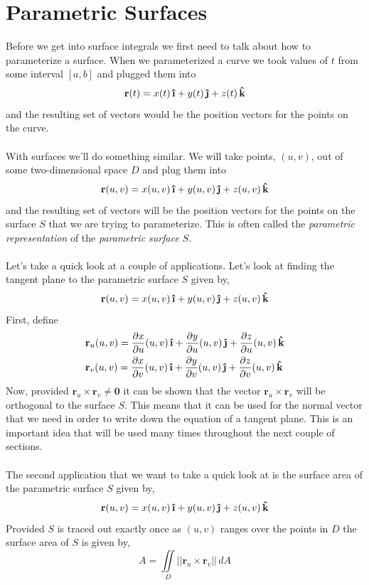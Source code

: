 \documentclass[10pt,reqno]{book}
\theoremstyle{definition}
\renewcommand{\vec}[1]{\mathbf{#1}}
\newcommand{\uvec}[1]{\boldsymbol{\hat{\textbf{#1}}}}
\begin{document}
	\section{Parametric Surfaces}
	
	Before we get into surface integrals we first need to talk about how to parameterize a surface. When we parameterized a curve we took values of $ t $ from some interval $ [a,b] $ and plugged them into
	\[ \vec{r}(t) = x(t)\,\uvec{\i} + y(t)\,\uvec{\j} + z(t)\,\uvec{k} \]
	and the resulting set of vectors would be the position vectors for the points on the curve. \\ \\
	With surfaces we'll do something similar. We will take points, $ (u,v) $, out of some two-dimensional space $ D $ and plug them into
	\[ \vec{r}(u,v) = x(u,v)\,\uvec{\i} + y(u,v)\,\uvec{\j} + z(u,v)\,\uvec{k} \]
	and the resulting set of vectors will be the position vectors for the points on the surface $ S $ that we are trying to parameterize. This is often called the \textit{parametric representation} of the \textit{parametric surface} $ S $. \\ \\
	Let's take a quick look at a couple of applications. Let's look at finding the tangent plane to the parametric surface $ S $ given by,
	\[ \vec{r}(u,v) = x(u,v)\,\uvec{\i} + y(u,v)\,\uvec{\j} + z(u,v)\,\uvec{k} \]
	First, define
	\begin{align*}
		& \vec{r}_u (u,v) = \frac{\partial x}{\partial u} (u,v) \, \uvec{\i} + \frac{\partial y}{\partial u} (u,v) \, \uvec{\j} + \frac{\partial z}{\partial u} (u,v) \, \uvec{k} \\
		& \vec{r}_v (u,v) = \frac{\partial x}{\partial v} (u,v) \, \uvec{\i} + \frac{\partial y}{\partial v} (u,v) \, \uvec{\j} + \frac{\partial z}{\partial v} (u,v) \, \uvec{k}
	\end{align*}
	Now, provided $ \vec{r}_u \times \vec{r}_v \neq \vec{0} $ it can be shown that the vector $ \vec{r}_u \times \vec{r}_v $ will be orthogonal to the surface $ S $. This means that it can be used for the normal vector that we need in order to write down the equation of a tangent plane. This is an important idea that will be used many times throughout the next couple of sections.\\ \\
	The second application that we want to take a quick look at is the surface area of the parametric surface $ S $ given by,
	\[ \vec{r}(u,v) = x(u,v)\,\uvec{\i} + y(u,v)\,\uvec{\j} + z(u,v)\,\uvec{k} \]
	Provided $ S $ is traced out exactly once as $ (u,v) $ ranges over the points in $ D $ the surface area of $ S $ is given by,
	\[ A = \iint\limits_D ||\vec{r}_u \times \vec{r}_v|| \,dA \]
	
\end{document}
